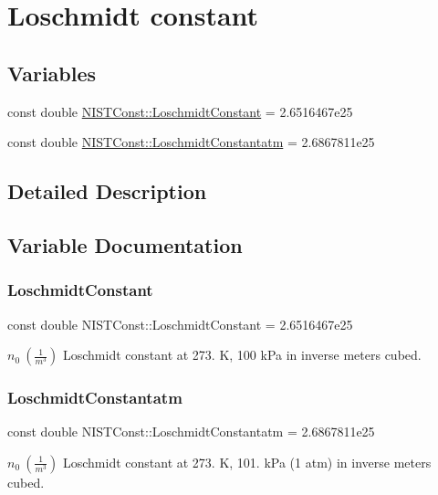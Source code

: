 \hypertarget{group___n_i_s_t_const-_loschmidt_constant}{}\section{Loschmidt constant}
\label{group___n_i_s_t_const-_loschmidt_constant}
\subsection*{Variables}
\begin{DoxyCompactItemize}
\item 
const double \hyperlink{group___n_i_s_t_const-_loschmidt_constant_gab4ddc03e855109d251efa0ae9e8fb80d}{N\+I\+S\+T\+Const\+::\+Loschmidt\+Constant} = 2.\+6516467e25
\item 
const double \hyperlink{group___n_i_s_t_const-_loschmidt_constant_ga1442f26c5c9f899f74ef7b546a41c461}{N\+I\+S\+T\+Const\+::\+Loschmidt\+Constantatm} = 2.\+6867811e25
\end{DoxyCompactItemize}


\subsection{Detailed Description}


\subsection{Variable Documentation}
\mbox{\label{group___n_i_s_t_const-_loschmidt_constant_gab4ddc03e855109d251efa0ae9e8fb80d}} 
\subsubsection{\texorpdfstring{Loschmidt\+Constant}{LoschmidtConstant}}
{\footnotesize\ttfamily const double N\+I\+S\+T\+Const\+::\+Loschmidt\+Constant = 2.\+6516467e25}

$n_0 \ (\frac{1}{m^3})$ Loschmidt constant at 273. K, 100 k\+Pa in inverse meters cubed. \mbox{\label{group___n_i_s_t_const-_loschmidt_constant_ga1442f26c5c9f899f74ef7b546a41c461}} 
\subsubsection{\texorpdfstring{Loschmidt\+Constantatm}{LoschmidtConstantatm}}
{\footnotesize\ttfamily const double N\+I\+S\+T\+Const\+::\+Loschmidt\+Constantatm = 2.\+6867811e25}

$n_0 \ (\frac{1}{m^3})$ Loschmidt constant at 273. K, 101. k\+Pa (1 atm) in inverse meters cubed. 